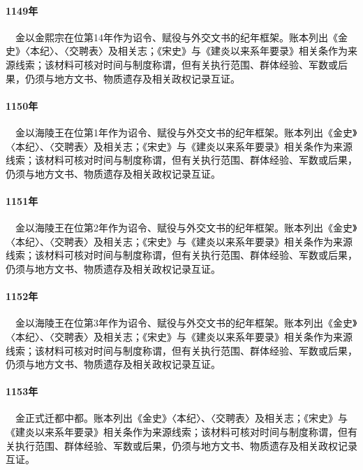 \paragraph{1149年}　金以金熙宗在位第14年作为诏令、赋役与外交文书的纪年框架。账本列出《金史》〈本纪〉、〈交聘表〉及相关志；《宋史》与《建炎以来系年要录》相关条作为来源线索；该材料可核对时间与制度称谓，但有关执行范围、群体经验、军数或后果，仍须与地方文书、物质遗存及相关政权记录互证。

\paragraph{1150年}　金以海陵王在位第1年作为诏令、赋役与外交文书的纪年框架。账本列出《金史》〈本纪〉、〈交聘表〉及相关志；《宋史》与《建炎以来系年要录》相关条作为来源线索；该材料可核对时间与制度称谓，但有关执行范围、群体经验、军数或后果，仍须与地方文书、物质遗存及相关政权记录互证。

\paragraph{1151年}　金以海陵王在位第2年作为诏令、赋役与外交文书的纪年框架。账本列出《金史》〈本纪〉、〈交聘表〉及相关志；《宋史》与《建炎以来系年要录》相关条作为来源线索；该材料可核对时间与制度称谓，但有关执行范围、群体经验、军数或后果，仍须与地方文书、物质遗存及相关政权记录互证。

\paragraph{1152年}　金以海陵王在位第3年作为诏令、赋役与外交文书的纪年框架。账本列出《金史》〈本纪〉、〈交聘表〉及相关志；《宋史》与《建炎以来系年要录》相关条作为来源线索；该材料可核对时间与制度称谓，但有关执行范围、群体经验、军数或后果，仍须与地方文书、物质遗存及相关政权记录互证。

\paragraph{1153年}　金正式迁都中都。账本列出《金史》〈本纪〉、〈交聘表〉及相关志；《宋史》与《建炎以来系年要录》相关条作为来源线索；该材料可核对时间与制度称谓，但有关执行范围、群体经验、军数或后果，仍须与地方文书、物质遗存及相关政权记录互证。

